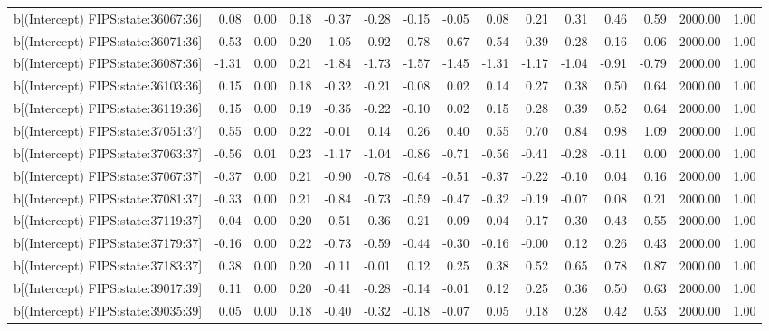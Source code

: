 \begin{table}[ht]
\begin{tabular}{rrrrrrrrrrrrrrr}
  b[(Intercept) FIPS:state:36067:36] & 0.08 & 0.00 & 0.18 & -0.37 & -0.28 & -0.15 & -0.05 & 0.08 & 0.21 & 0.31 & 0.46 & 0.59 & 2000.00 & 1.00 \\ 
  b[(Intercept) FIPS:state:36071:36] & -0.53 & 0.00 & 0.20 & -1.05 & -0.92 & -0.78 & -0.67 & -0.54 & -0.39 & -0.28 & -0.16 & -0.06 & 2000.00 & 1.00 \\ 
  b[(Intercept) FIPS:state:36087:36] & -1.31 & 0.00 & 0.21 & -1.84 & -1.73 & -1.57 & -1.45 & -1.31 & -1.17 & -1.04 & -0.91 & -0.79 & 2000.00 & 1.00 \\ 
  b[(Intercept) FIPS:state:36103:36] & 0.15 & 0.00 & 0.18 & -0.32 & -0.21 & -0.08 & 0.02 & 0.14 & 0.27 & 0.38 & 0.50 & 0.64 & 2000.00 & 1.00 \\ 
  b[(Intercept) FIPS:state:36119:36] & 0.15 & 0.00 & 0.19 & -0.35 & -0.22 & -0.10 & 0.02 & 0.15 & 0.28 & 0.39 & 0.52 & 0.64 & 2000.00 & 1.00 \\ 
  b[(Intercept) FIPS:state:37051:37] & 0.55 & 0.00 & 0.22 & -0.01 & 0.14 & 0.26 & 0.40 & 0.55 & 0.70 & 0.84 & 0.98 & 1.09 & 2000.00 & 1.00 \\ 
  b[(Intercept) FIPS:state:37063:37] & -0.56 & 0.01 & 0.23 & -1.17 & -1.04 & -0.86 & -0.71 & -0.56 & -0.41 & -0.28 & -0.11 & 0.00 & 2000.00 & 1.00 \\ 
  b[(Intercept) FIPS:state:37067:37] & -0.37 & 0.00 & 0.21 & -0.90 & -0.78 & -0.64 & -0.51 & -0.37 & -0.22 & -0.10 & 0.04 & 0.16 & 2000.00 & 1.00 \\ 
  b[(Intercept) FIPS:state:37081:37] & -0.33 & 0.00 & 0.21 & -0.84 & -0.73 & -0.59 & -0.47 & -0.32 & -0.19 & -0.07 & 0.08 & 0.21 & 2000.00 & 1.00 \\ 
  b[(Intercept) FIPS:state:37119:37] & 0.04 & 0.00 & 0.20 & -0.51 & -0.36 & -0.21 & -0.09 & 0.04 & 0.17 & 0.30 & 0.43 & 0.55 & 2000.00 & 1.00 \\ 
  b[(Intercept) FIPS:state:37179:37] & -0.16 & 0.00 & 0.22 & -0.73 & -0.59 & -0.44 & -0.30 & -0.16 & -0.00 & 0.12 & 0.26 & 0.43 & 2000.00 & 1.00 \\ 
  b[(Intercept) FIPS:state:37183:37] & 0.38 & 0.00 & 0.20 & -0.11 & -0.01 & 0.12 & 0.25 & 0.38 & 0.52 & 0.65 & 0.78 & 0.87 & 2000.00 & 1.00 \\ 
  b[(Intercept) FIPS:state:39017:39] & 0.11 & 0.00 & 0.20 & -0.41 & -0.28 & -0.14 & -0.01 & 0.12 & 0.25 & 0.36 & 0.50 & 0.63 & 2000.00 & 1.00 \\ 
  b[(Intercept) FIPS:state:39035:39] & 0.05 & 0.00 & 0.18 & -0.40 & -0.32 & -0.18 & -0.07 & 0.05 & 0.18 & 0.28 & 0.42 & 0.53 & 2000.00 & 1.00 \\ 

\end{tabular}
\end{table}
